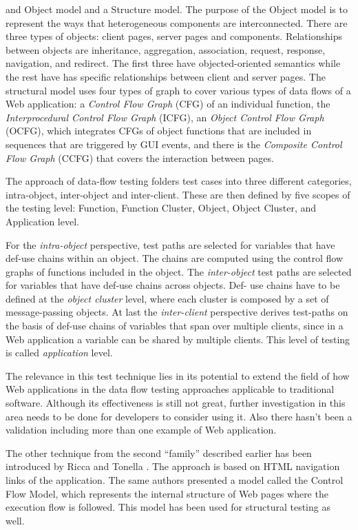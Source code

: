 \documentclass[a4paper]{article}
\begin{document}
and Object model and a Structure model. The purpose of the Object model is to represent the
ways that heterogeneous components are interconnected. There are three types of objects: client
pages, server pages and components. Relationships between objects are inheritance, aggregation,
association, request, response, navigation, and redirect. The first three have objected-oriented
semantics while the rest have has specific relationships between client and server pages. The
structural model uses four types of graph to cover various types of data flows of a Web application:
a \emph{Control Flow Graph} (CFG) of an individual function, the \emph{Interprocedural Control Flow Graph} (ICFG),
an \emph{Object Control Flow Graph} (OCFG), which integrates CFGs of object functions that are included in
sequences that are triggered by GUI events, and there is the \emph{Composite Control Flow Graph} (CCFG)
that covers the interaction between pages.

The approach of data-flow testing folders test cases into three different categories, intra-object,
inter-object and inter-client. These are then defined by five scopes of the testing level: Function,
Function Cluster, Object, Object Cluster, and Application level.

For the \emph{intra-object} perspective, test paths are selected for variables that have def-use chains within
an object. The chains are computed using the control flow graphs of functions included in the object.
The \emph{inter-object} test paths are selected for variables that have def-use chains across objects. Def-
use chains have to be defined at the \emph{object cluster} level, where each cluster is composed by a set of
message-passing objects. At last the \emph{inter-client} perspective derives test-paths on the basis of def-use
chains of variables that span over multiple clients, since in a Web application a variable can be shared
by multiple clients. This level of testing is called \emph{application} level.

The relevance in this test technique lies in its potential to extend the field of how Web applications in
the data flow testing approaches applicable to traditional software. Although its effectiveness is still
not great, further investigation in this area needs to be done for developers to consider using it. Also
there hasn’t been a validation including more than one example of Web application.

The other technique from the second “family” described earlier has been introduced by Ricca and
Tonella \cite{rt01}. The approach is based on HTML navigation links of the application. The same authors
presented a model called the Control Flow Model, which represents the internal structure of Web
pages where the execution flow is followed. This model has been used for structural testing as well.
\end{document}
